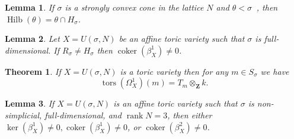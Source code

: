\documentclass[10pt,a4paper]{amsart}
\newtheorem{lemma}{Lemma}
\newtheorem{theorem}{Theorem}
\DeclareMathOperator{\Hilb}{Hilb}
\DeclareMathOperator{\ZZ}{\mathbf{Z}}
\DeclareMathOperator{\coker}{coker}
\DeclareMathOperator{\dual}{\!^{\vee}}
\DeclareMathOperator{\rank}{rank}
\DeclareMathOperator{\tors}{tors}
\begin{document}
\begin{lemma} \label{lemma: hilbert basis face}
If $\sigma$ is a strongly convex cone in the lattice $N$ and $\theta < \sigma\dual$, then $\Hilb(\theta) = \theta \cap H_{\sigma }$. 
\end{lemma}

\begin{lemma} \label{lemma: coker1 = H less R}
	Let $X=U(\sigma,N)$ be an affine toric variety such that $\sigma$ is full-dimensional. If $R_{\sigma} \neq H_{\sigma}$ then $\coker(\beta^1_X) \neq 0$.
\end{lemma}

\begin{theorem} \label{thm:kahler_torsion}
	If $X = U(\sigma,N)$ is a toric variety then for any $m \in S_\sigma$ we have
	\begin{equation}
	\tors (\Omega_{X}^1)(m) = T_m \otimes_{\ZZ} k.
	\end{equation}
\end{theorem}

\begin{lemma} \label{lemma: base case}
    If $X = U(\sigma,N)$ is an affine toric variety such that $\sigma$ is non-simplicial, full-dimensional, and $\rank N = 3$, then either $\ker(\beta^1_X) \neq 0, \coker(\beta^1_X)\neq 0$, or $\coker(\beta^2_X)\neq 0$.
\end{lemma}
\end{document}

